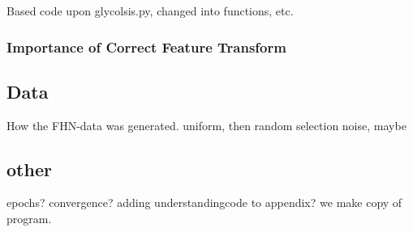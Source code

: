 Based code upon glycolsis.py, changed into functions, etc.




\subsubsection{Importance of Correct Feature Transform}















\subsection{Data}

How the FHN-data was generated.
uniform, then random selection
noise, maybe




\subsection{other}

epochs?
convergence?
adding understandingcode to appendix?
we make copy of program.

















